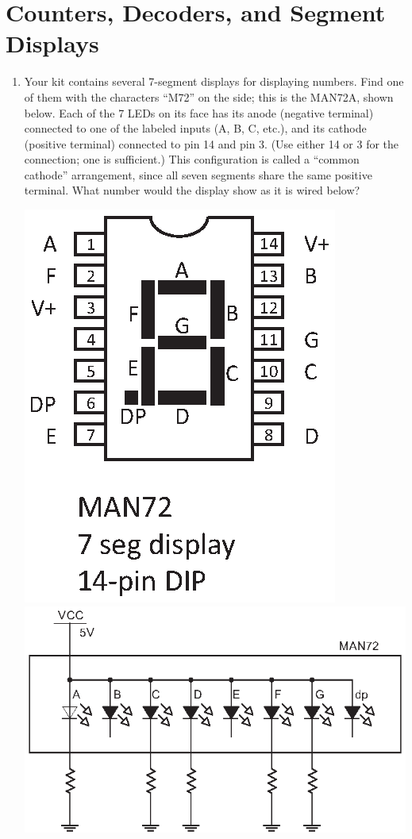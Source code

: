 \section{Counters, Decoders, and Segment Displays}
\label{lab_counters}


\bigskip

\begin{enumerate}[wide]

\item Your kit contains several 7-segment displays for displaying numbers.  Find one of them with the characters ``M72'' on the side; this is the MAN72A, shown below.  Each of the 7 LEDs on its face has its anode (negative terminal) connected to one of the labeled inputs (A, B, C, etc.), and its cathode (positive terminal) connected to pin 14 and pin 3.  (Use either 14 or 3 for the connection; one is sufficient.) This configuration is called a ``common cathode'' arrangement, since all seven segments share the same positive terminal.  What number would the display show as it is wired below? 
\begin{center}
\includegraphics[scale=0.8]{appendices/pinouts/man72.eps}
\includegraphics{counters/man72_circuit.eps}
\end{center}
  

\end{enumerate}
